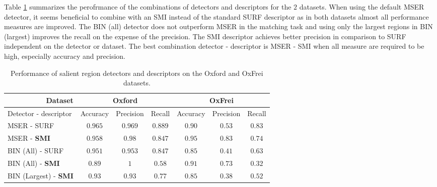 \documentclass[a4paper,11pt]{article}
\begin{document}
\begin{comment}
\end{comment}

Table \ref{tab:perf} summarizes the perofrmance of the combinations of detectors and descriptors for the $2$ datasets. When using the default MSER detector, it seems beneficial to combine with an SMI instead of the standard SURF descriptor as in both datasets almost all performance measures are improved. The BIN (all) detector does not outperform MSER in the matching task and using only the largest regions in BIN (largest) improves the recall on the expense of the precision. The SMI descriptor achieves better precision in comparison to SURF independent on the detector or dataset. The best combination detector - descriptor is MSER - SMI when all measure are required to be high, especially accuracy and precision.

\begin{table}[!ht]
\begin{center}
  \vspace{-6pt}
\begin{tabular}{|l|*{6}{c|}}  %
\hline
\multicolumn{1}{|r}{Dataset} & \multicolumn{3}{|c|}{Oxford}  & \multicolumn{3}{|c|}{OxFrei} \\ \hline
{Detector - descriptor}  & Accuracy      & Precision   &  Recall       & Accuracy        & Precision & Recall \\ \hline
MSER - SURF              & {\boldmath $0.965$} & $0.969$     & {\boldmath $0.889$} &  $0.90$         & $0.53$    & {\boldmath $0.83$}\\ \hline
MSER - \bf{SMI}          & {\boldmath $0.958$}       & {\boldmath $0.98$}&  {\boldmath$0.847$}       & {\boldmath $0.95$}    &{\boldmath $0.83$} &  {\boldmath$0.74$} \\ \hline
BIN (All) - SURF         & $0.951$       & $0.953$     &$0.847$        & $0.85$          & $0.41$    & $0.63$\\ \hline
BIN (All) - \bf{SMI}     & $0.89$        & {\boldmath $1$}   &$0.58$         & $0.91$          & $0.73$    & $0.32$\\ \hline
BIN (Largest) - \bf{SMI} & $0.93$        & $0.93$      &$0.77$         & $0.85$          & $0.38$    & $0.52$\\ \hline
\end{tabular}
\end{center}
\vspace{-20pt}
\caption{Performance of salient region detectors and descriptors on the Oxford and OxFrei datasets.} \label{tab:perf}
  \vspace{-10pt}
\end{table}
\end{document}
